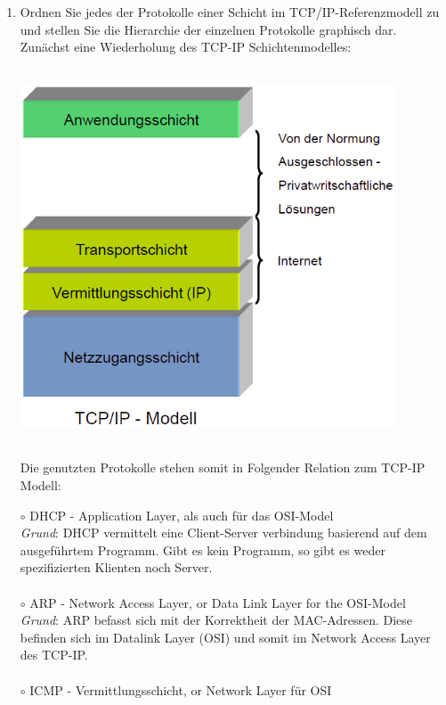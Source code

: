 \documentclass[11pt]{article}
\begin{document}
\begin{enumerate}[\thesection .1]
        \item Ordnen Sie jedes der Protokolle einer Schicht im TCP/IP-Referenzmodell zu und stellen Sie die Hierarchie der einzelnen Protokolle graphisch dar.\\
        Zunächst eine Wiederholung des TCP-IP Schichtenmodelles:
        \begin{center}
            \includegraphics[width=30em,height=30em]{TCP-IP-Modell.png}
        \end{center}
\pagebreak
        Die genutzten Protokolle stehen somit in Folgender Relation zum TCP-IP Modell:
        \begin{addmargin}[1em]{1em}
            $\circ$ DHCP - Application Layer, als auch für das OSI-Model\\
            \emph{Grund}: DHCP vermittelt eine Client-Server verbindung basierend auf dem ausgeführtem Programm.
            Gibt es kein Programm, so gibt es weder spezifizierten Klienten noch Server.\\\\
            $\circ$ ARP - Network Access Layer, or Data Link Layer for the OSI-Model\\
            \emph{Grund}: ARP befasst sich mit der Korrektheit der MAC-Adressen. Diese befinden sich im Datalink Layer (OSI) und somit
            im Network Access Layer des TCP-IP.\\\\
            $\circ$ ICMP - Vermittlungsschicht, or Network Layer für OSI\\

\end{addmargin}
\end{enumerate}
\end{document}
